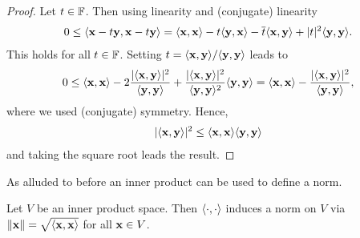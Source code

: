 \documentclass{article}
\begin{document}
\begin{proof}
Let $t\in {\mathbb{F}}$. Then using linearity and (conjugate) linearity
\begin{align*}
    0 \leq \langle {\mathbf{x}}-t{\mathbf{y}},{\mathbf{x}}-t{\mathbf{y}} \rangle = \langle {\mathbf{x}},{\mathbf{x}} \rangle - t\langle {\mathbf{y}},{\mathbf{x}} \rangle - \overline{t}\langle {\mathbf{x}},{\mathbf{y}} \rangle+ \vert t\vert^2 \langle {\mathbf{y}},{\mathbf{y}} \rangle.
\end{align*}
This holds for all $t\in {\mathbb{F}}$. Setting $t =\langle {\mathbf{x}},{\mathbf{y}} \rangle/\langle {\mathbf{y}},{\mathbf{y}} \rangle$ leads to 
\begin{align*}
    0 \leq   \langle {\mathbf{x}},{\mathbf{x}} \rangle - 2 \frac{\vert\langle {\mathbf{x}},{\mathbf{y}} \rangle\vert^2}{\langle {\mathbf{y}},{\mathbf{y}} \rangle}+ \frac{\vert\langle {\mathbf{x}},{\mathbf{y}} \rangle\vert^2}{\langle {\mathbf{y}},{\mathbf{y}} \rangle^2}\langle {\mathbf{y}},{\mathbf{y}} \rangle = \langle {\mathbf{x}},{\mathbf{x}} \rangle -  \frac{\vert\langle {\mathbf{x}},{\mathbf{y}} \rangle\vert^2}{\langle {\mathbf{y}},{\mathbf{y}} \rangle},
\end{align*}
where we used (conjugate) symmetry. Hence,
\begin{align*}
    \vert \langle {\mathbf{x}},{\mathbf{y}} \rangle\vert^2 \leq \langle {\mathbf{x}},{\mathbf{x}} \rangle\langle {\mathbf{y}},{\mathbf{y}} \rangle
\end{align*}
and taking the square root leads the result. 
\end{proof}

As alluded to before an inner product can be used to define a norm.

\begin{proposition}
Let $V$ be an inner product space. Then $\langle \cdot,\cdot \rangle$ induces a norm on $V$ via $\Vert {\mathbf{x}}\Vert =\sqrt{\langle {\mathbf{x}},{\mathbf{x}} \rangle} $ for all ${\mathbf{x}} \in V$.
\end{proposition}
\end{document}
